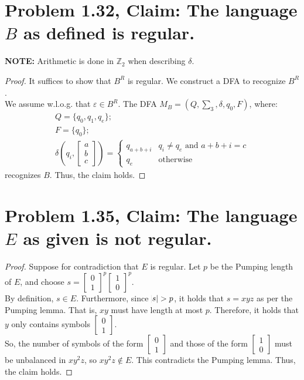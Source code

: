 \documentclass[12pt]{article}
\begin{document}
\section*{Problem 1.32, Claim: The language $B$ as defined is regular.}
\textbf{NOTE:} Arithmetic is done in $\mathbb{Z}_{2}$ when describing $\delta$.
\begin{proof}
	It suffices to show that $B^{R}$ is regular. We construct a DFA to recognize $B^{R}$. \\
	\newline
	We assume w.l.o.g. that $\varepsilon \in B^{R}$. The DFA $M_{B} = (Q, \sum_{3}, \delta, q_{0}, F)$, where:
	\begin{align}
		Q = \{q_{0}, q_{1}, q_{e}\}; \\
		F = \{q_{0}\}; \\
		\delta\left(q_{i}, \begin{bmatrix} a \\ b \\ c \end{bmatrix}\right) = \begin{cases} q_{a + b + i} & q_{i} \neq q_{e} \text{ and } a + b + i = c \\ q_{e} & \text{otherwise}\end{cases}
	\end{align}
	recognizes $B$. Thus, the claim holds.
\end{proof}

\section*{Problem 1.35, Claim: The language $E$ as given is not regular.}
\begin{proof}
  Suppose for contradiction that $E$ is regular. Let $p$ be the Pumping length of $E$, and choose $s = \begin{bmatrix} 0 \\ 1 \end{bmatrix}^{p} \begin{bmatrix} 1 \\ 0 \end{bmatrix}^{p}$. \\
  \newline
  By definition, $s \in E$. Furthermore, since $\abs{s} > p$, it holds that $s = xyz$ as per the Pumping lemma. That is, $xy$ must have length at most $p$. Therefore, it holds that $y$ only contains symbols $\begin{bmatrix} 0 \\ 1\end{bmatrix}$. \\
    \newline
    So, the number of symbols of the form $\begin{bmatrix} 0 \\ 1 \end{bmatrix}$ and those of the form $\begin{bmatrix} 1 \\ 0 \end{bmatrix}$ must be unbalanced in $xy^{2}z$, so $xy^{2}z \notin E$. This contradicts the Pumping lemma. Thus, the claim holds.
\end{proof}
\end{document}
